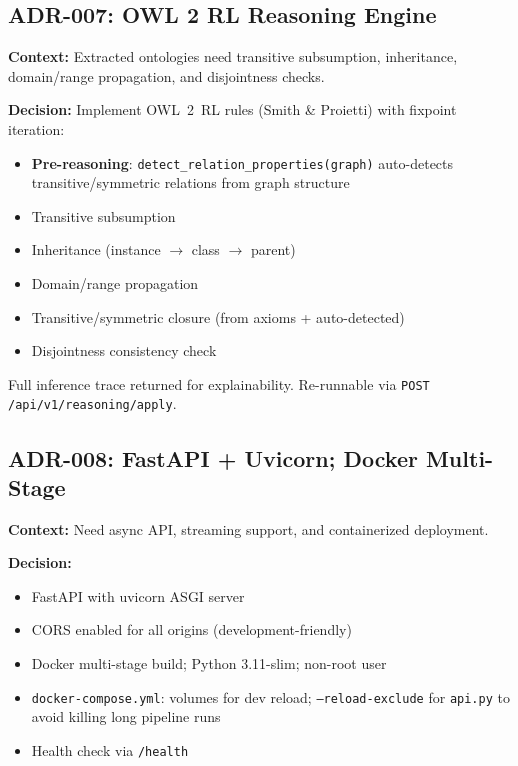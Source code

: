 \documentclass[11pt,a4paper]{article}
\begin{document}
\subsection{ADR-007: OWL 2 RL Reasoning Engine}
\label{sec:adr-reasoning}

\textbf{Context:} Extracted ontologies need transitive subsumption, inheritance, domain/range propagation, and disjointness checks.

\textbf{Decision:} Implement OWL~2~RL rules (Smith \& Proietti) with fixpoint iteration:
\begin{itemize}
    \item \textbf{Pre-reasoning}: \texttt{detect\_relation\_properties(graph)} auto-detects transitive/symmetric relations from graph structure
    \item Transitive subsumption
    \item Inheritance (instance $\rightarrow$ class $\rightarrow$ parent)
    \item Domain/range propagation
    \item Transitive/symmetric closure (from axioms + auto-detected)
    \item Disjointness consistency check
\end{itemize}

Full inference trace returned for explainability. Re-runnable via \texttt{POST /api/v1/reasoning/apply}.

\subsection{ADR-008: FastAPI + Uvicorn; Docker Multi-Stage}
\label{sec:adr-deployment}

\textbf{Context:} Need async API, streaming support, and containerized deployment.

\textbf{Decision:}
\begin{itemize}
    \item FastAPI with uvicorn ASGI server
    \item CORS enabled for all origins (development-friendly)
    \item Docker multi-stage build; Python 3.11-slim; non-root user
    \item \texttt{docker-compose.yml}: volumes for dev reload; \texttt{--reload-exclude} for \texttt{api.py} to avoid killing long pipeline runs
    \item Health check via \texttt{/health}
\end{itemize}
\end{document}
